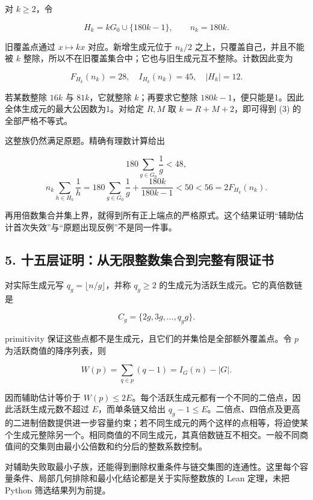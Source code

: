 \documentclass[
  11pt,
]{article}
\begin{document}
对 \(k\ge2\)，令

\[
H_k=kG_0\cup\{180k-1\},\qquad n_k=180k. \tag{7}
\]

旧覆盖点通过 \(x\mapsto kx\) 对应。新增生成元位于 \(n_k/2\)
之上，只覆盖自己，并且不能被 \(k\)
整除，所以不在旧覆盖集合中；它也与旧生成元互不整除。计数因此变为

\[
F_{H_k}(n_k)=28,\quad I_{H_k}(n_k)=45,\quad |H_k|=12.
\]

若某数整除 \(16k\) 与 \(81k\)，它就整除 \(k\)；再要求它整除
\(180k-1\)，便只能是1。因此全体生成元的最大公因数为1。对给定 \(R,M\) 取
\(k=R+M+2\)，即可得到 (3) 的全部严格不等式。

这整族仍然满足原题。精确有理数计算给出

\[
180\sum_{g\in G_0}\frac1g<48,
\] \[
n_k\sum_{h\in H_k}\frac1h
=180\sum_{g\in G_0}\frac1g+\frac{180k}{180k-1}<50<56=2F_{H_k}(n_k).
\]

再用倍数集合并集上界，就得到所有正上端点的严格原式。这个结果证明``辅助估计首次失效''与``原题出现反例''不是同一件事。

\hypertarget{ux5341ux4e94ux5c42ux8bc1ux660eux4eceux65e0ux9650ux6574ux6570ux96c6ux5408ux5230ux5b8cux6574ux6709ux9650ux8bc1ux4e66}{%
\subsection{5.
十五层证明：从无限整数集合到完整有限证书}\label{ux5341ux4e94ux5c42ux8bc1ux660eux4eceux65e0ux9650ux6574ux6570ux96c6ux5408ux5230ux5b8cux6574ux6709ux9650ux8bc1ux4e66}}

对实际生成元写 \(q_g=\lfloor n/g\rfloor\)，并称 \(q_g\ge2\)
的生成元为活跃生成元。它的真倍数链是

\[
C_g=\{2g,3g,\ldots,q_gg\}.
\]

primitivity 保证这些点都不是生成元，且它们的并集恰是全部额外覆盖点。令
\(p\) 为活跃商值的降序列表，则

\[
W(p)=\sum_{q\in p}(q-1)=I_G(n)-|G|.
\]

因而辅助估计等价于
\(W(p)\le2E\)。每个活跃生成元都有一个不同的二倍点，因此活跃生成元数不超过
\(E\)，而单条链又给出
\(q_g-1\le E\)。二倍点、四倍点及更高的二进制倍数提供进一步容量约束；若不同生成元的两个这样的点相等，将迫使某个生成元整除另一个。相同商值的不同生成元，其真倍数链互不相交。一般不同商值间的交集则由最小公倍数和约分后的整数系数控制。

对辅助失败取最小子族，还能得到删除权重条件与链交集图的连通性。这里每个容量条件、局部几何排除和最小化结论都是关于实际整数族的
Lean 定理，未把 Python 筛选结果列为前提。
\end{document}
